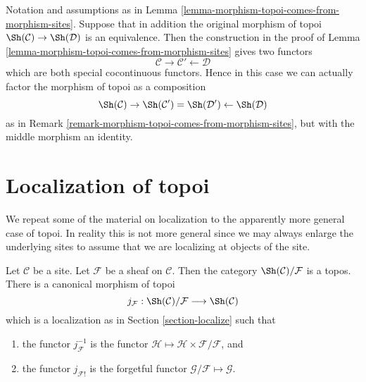 \begin{remark}
\label{remark-equivalence-topoi-comes-from-morphism-sites}
Notation and assumptions
as in Lemma \ref{lemma-morphism-topoi-comes-from-morphism-sites}.
Suppose that in addition the original morphism of topoi
$\Sh(\mathcal{C}) \to \Sh(\mathcal{D})$ is an equivalence.
Then the construction in the proof of
Lemma \ref{lemma-morphism-topoi-comes-from-morphism-sites}
gives two functors
$$
\mathcal{C} \rightarrow \mathcal{C}' \leftarrow \mathcal{D}
$$
which are both special cocontinuous functors.
Hence in this case we can actually
factor the morphism of topoi as a composition
$$
\Sh(\mathcal{C}) \rightarrow
\Sh(\mathcal{C}') =
\Sh(\mathcal{D}') \leftarrow
\Sh(\mathcal{D})
$$
as in Remark \ref{remark-morphism-topoi-comes-from-morphism-sites}, but
with the middle morphism an identity.
\end{remark}









\section{Localization of topoi}
\label{section-localize-topoi}

\noindent
We repeat some of the material on localization to
the apparently more general case of topoi. In reality this is not
more general since we may always enlarge the underlying sites
to assume that we are localizing at objects of the site.

\begin{lemma}
\label{lemma-localize-topos}
Let $\mathcal{C}$ be a site.
Let $\mathcal{F}$ be a sheaf on $\mathcal{C}$.
Then the category $\Sh(\mathcal{C})/\mathcal{F}$
is a topos. There is a canonical morphism of topoi
$$
j_\mathcal{F} :
\Sh(\mathcal{C})/\mathcal{F}
\longrightarrow
\Sh(\mathcal{C})
$$
which is a localization as in
Section \ref{section-localize}
such that
\begin{enumerate}
\item the functor $j_\mathcal{F}^{-1}$ is the functor
$\mathcal{H} \mapsto \mathcal{H} \times \mathcal{F}/\mathcal{F}$, and
\item the functor $j_{\mathcal{F}!}$ is the forgetful
functor $\mathcal{G}/\mathcal{F} \mapsto \mathcal{G}$.
\end{enumerate}
\end{lemma}

